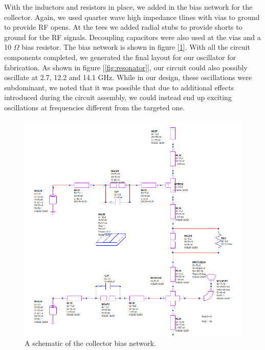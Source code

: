 \documentclass{article}
\begin{document}
With the inductors and resistors in place, we added in the bias network for the collector. Again, we used quarter wave high impedance tlines with vias to ground to provide RF opens. At the tees we added radial stubs to provide shorts to ground for the RF signals. Decoupling capacitors were also used at the vias and a 10 $\Omega$ bias resistor. The bias network is shown in figure [\ref{fig:collbias2}]. With all the circuit components completed, we generated the final layout for our oscillator for fabrication. As shown in figure [\ref{fig:resonator}], our circuit could also possibly oscillate at 2.7, 12.2 and 14.1 GHz. While in our design, these oscillations were subdominant, we noted that it was possible that due to additional effects introduced during the circuit assembly, we could instead end up exciting oscillations at frequencies different from the targeted one.
\begin{figure}[!htbp]
    \centering
    \includegraphics[scale=0.4]{collector_bias_2.png}
    \caption{A schematic of the collector bias network.}
    \label{fig:collbias2}
\end{figure}
\end{document}
